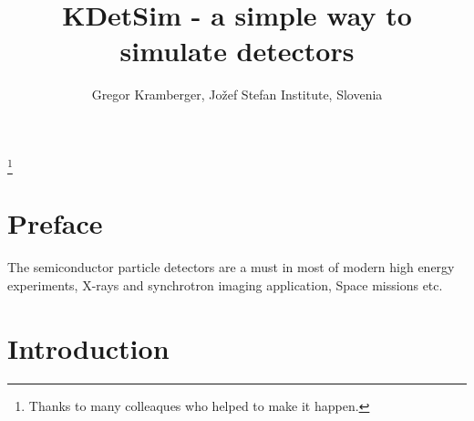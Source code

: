 \documentclass{book}
\begin{document}
\pagestyle{empty}
\title{\textbf{KDetSim - a simple way to simulate detectors}}
\author{Gregor Kramberger, Jo\v zef Stefan Institute, Slovenia}



\maketitle


\thispagestyle{empty}
\thanks{Thanks to many colleaques who helped to make it happen.}
\newpage




\pagestyle{fancy}
\fancyhf{}
\lhead[]{\thepage}
\rhead[\thepage]{}


\doublespacing



\chapter*{Preface}

The semiconductor particle detectors are a must in most of modern high energy
experiments, X-rays and synchrotron imaging application, Space missions etc. 



\newpage
\thispagestyle{empty}



\chapter{Introduction}
\end{document}
